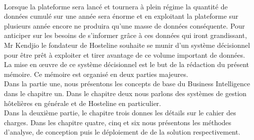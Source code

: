 	\paragraph{}
	Lorsque la plateforme sera lancé et tournera à plein régime la quantité de données cumulé sur une année sera énorme et en exploitant la plateforme sur plusieurs année encore ne produira qu’une masse de données conséquente. Pour anticiper sur les besoins de s’informer grâce à ces données  qui iront grandissant, Mr Kendjio le fondateur de Hosteline souhaite se munir d’un système décisionnel pour être prêt à exploiter et tirer avantage de ce volume important de données. La mise en œuvre de ce système décisionnel est le but de la rédaction du présent mémoire. Ce mémoire est organisé en deux parties majeures.\\
Dans la partie une, nous présentons les concepts de base du Business Intelligence dans le chapitre un. Dans le chapitre deux nous parlons des systèmes de gestion hôtelières en générale et de Hosteline en particulier.\\
	Dans la deuxième partie, le chapitre trois donnes les détails sur le cahier des charges. Dans les chapitre quatre, cinq et six nous présentons les méthodes d’analyse, de conception  puis le déploiement de de la solution respectivement.


